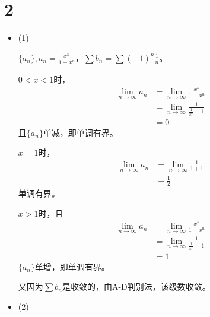 \documentclass{article}
\begin{document}
\section*{2}

\begin{itemize}
  \item (1)

        $\{a_n\}, a_n = \frac{x^n}{1 + x^n}$，$\sum b_n = \sum (-1)^n \frac{1}{n}$。

        $0 < x < 1$时，
        \begin{align*}
          \lim\limits_{n \to \infty} a_n
           & = \lim\limits_{n \to \infty} \frac{x^n}{1 + x^n}         \\
           & = \lim\limits_{n \to \infty} \frac{1}{\frac{1}{x^n} + 1} \\
           & = 0
        \end{align*}
        且$\{a_n\}$单减，即单调有界。

        $x = 1$时，
        \begin{align*}
          \lim\limits_{n \to \infty} a_n
           & = \lim\limits_{n \to \infty} \frac{1}{1 + 1} \\
           & = \frac{1}{2}
        \end{align*}
        单调有界。

        $x > 1$时，且
        \begin{align*}
          \lim\limits_{n \to \infty} a_n
           & = \lim\limits_{n \to \infty} \frac{x^n}{1 + x^n}         \\
           & = \lim\limits_{n \to \infty} \frac{1}{\frac{1}{x^n} + 1} \\
           & = 1
        \end{align*}
        $\{a_n\}$单增，即单调有界。

        又因为$\sum b_n$是收敛的，由A-D判别法，该级数收敛。

  \item (2)


\end{itemize}
\end{document}
